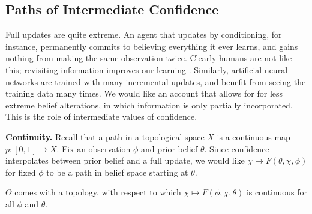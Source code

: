 \subsection{%
	Paths of Intermediate Confidence
	}

Full updates are quite extreme.
An agent that updates by conditioning, for instance,
permanently commits to believing everything it ever learns,
and gains nothing from making the same observation twice.
Clearly humans are not like this; revisiting information
 	improves our learning \parencite{ausubel1965effect}.
Similarly, artificial neural networks are trained with
 	many incremental updates, and benefit from seeing 
	the training data many times.
We would like an account that allows for for less extreme belief alterations,
in which information is only partially incorporated.
This is the role of intermediate values of confidence.

\textbf{Continuity.}
Recall that a path in a topological space $X$ is a continuous map $p : [0,1] \to X$. 
Fix an observation $\phi$ and prior belief $\theta$. 
Since confidence interpolates 
between prior belief and a full update,
we would like 
$\chi \mapsto F(\theta,\chi,\phi)$
for fixed $\phi$ to be a path
in belief space starting at $\theta$.

\begin{CFaxioms}[nosep]
	\item
	$\Theta$ comes with a topology, with respect to which
	$
	\chi \mapsto F(\phi,\chi,\theta)
	$
	is continuous
	for all $\phi$ and $\theta$.
	\label{ax:cont}
\end{CFaxioms}


